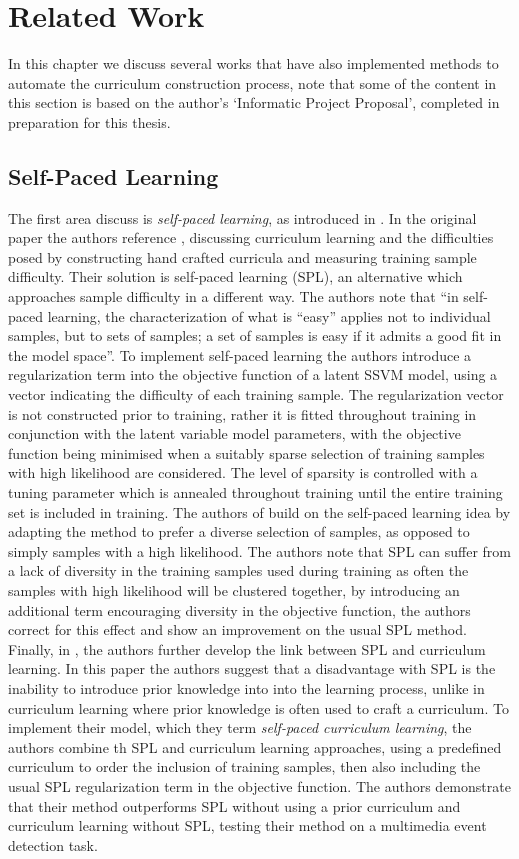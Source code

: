 \chapter{Related Work}\label{Related Work}
In this chapter we discuss several works that have also implemented methods to automate the curriculum construction process, note that some of the content in this section is based on the author's `Informatic Project Proposal', completed in preparation for this thesis.
\section{Self-Paced Learning}
The first area discuss is \textit{self-paced learning}, as introduced in \cite{kumar2010self}. In the original paper the authors reference \cite{Bengio2009}, discussing curriculum learning and the difficulties posed by constructing hand crafted curricula and measuring training sample difficulty. Their solution is self-paced learning (SPL), an alternative which approaches sample difficulty in a different way. The authors note that ``in self-paced learning, the characterization of what is “easy” applies not to individual samples, but to sets of samples; a set of samples is easy if it admits a good fit in the model space''. To implement self-paced learning the authors introduce a regularization term into the objective function of a latent SSVM \cite{felzenszwalb2008discriminatively} model, using a vector indicating the difficulty of each training sample. The regularization vector is not constructed prior to training, rather it is fitted throughout training in conjunction with the latent variable model parameters, with the objective function being minimised when a suitably sparse selection of training samples with high likelihood are considered. The level of sparsity is controlled with a tuning parameter which is annealed throughout training until the entire training set is included in training. The authors of \cite{jiang2014self} build on the self-paced learning idea by adapting the method to prefer a diverse selection of samples, as opposed to simply samples with a high likelihood. The authors note that SPL can suffer from a lack of diversity in the training samples used during training as often the samples with high likelihood will be clustered together,  by introducing an additional term encouraging diversity in the objective function, the authors correct for this effect and show an improvement on the usual SPL method. Finally, in \cite{jiang2015self}, the authors further develop the link between SPL and curriculum learning. In this paper the authors suggest that a disadvantage with SPL is the inability to introduce prior knowledge into into the learning process, unlike in curriculum learning where prior knowledge is often used to craft a curriculum. To implement their model, which they term \textit{self-paced curriculum learning}, the authors combine th SPL and curriculum learning approaches, using a predefined curriculum to order the inclusion of training samples, then also including the usual SPL regularization term in the objective function. The authors demonstrate that their method outperforms SPL without using a prior curriculum and curriculum learning without SPL, testing their method on a multimedia event detection task.
